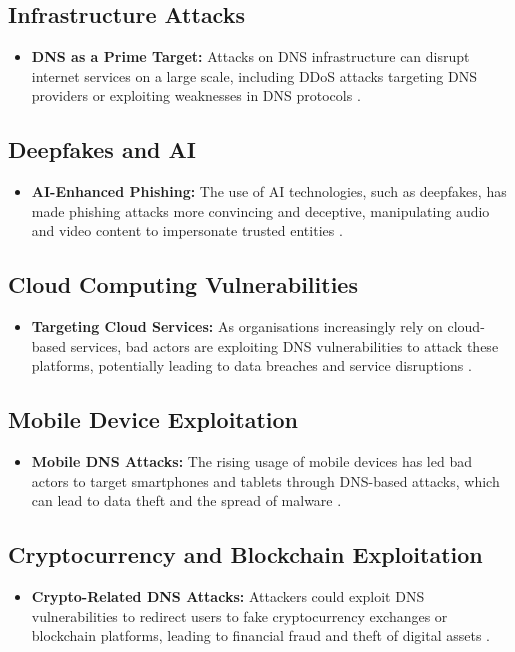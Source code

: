 \subsection{Infrastructure Attacks}
\begin{itemize}
    \item \textbf{DNS as a Prime Target:} Attacks on DNS infrastructure can disrupt internet services on a large scale, including DDoS attacks targeting DNS providers or exploiting weaknesses in DNS protocols \cite{dooley2017dns}.
\end{itemize}

\subsection{Deepfakes and AI}
\begin{itemize}
    \item \textbf{AI-Enhanced Phishing:} The use of AI technologies, such as deepfakes, has made phishing attacks more convincing and deceptive, manipulating audio and video content to impersonate trusted entities \cite{schick2020deep}.
\end{itemize}

\subsection{Cloud Computing Vulnerabilities}
\begin{itemize}
    \item \textbf{Targeting Cloud Services:} As organisations increasingly rely on cloud-based services, bad actors are exploiting DNS vulnerabilities to attack these platforms, potentially leading to data breaches and service disruptions \cite{mather2009cloud}.
\end{itemize}

\subsection{Mobile Device Exploitation}
\begin{itemize}
    \item \textbf{Mobile DNS Attacks:} The rising usage of mobile devices has led bad actors to target smartphones and tablets through DNS-based attacks, which can lead to data theft and the spread of malware \cite{au2016mobile}.
\end{itemize}

\subsection{Cryptocurrency and Blockchain Exploitation}
\begin{itemize}
    \item \textbf{Crypto-Related DNS Attacks:} Attackers could exploit DNS vulnerabilities to redirect users to fake cryptocurrency exchanges or blockchain platforms, leading to financial fraud and theft of digital assets \cite{bashir2019advanced}.
\end{itemize}

